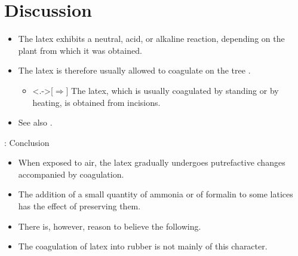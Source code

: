 \section{Discussion}


\begin{frame}{\titleprefix}

	\begin{itemize}[<+->]
		\item The latex exhibits a neutral, acid, or alkaline reaction, depending on the plant from which it was obtained.
		\item The latex is therefore usually allowed to coagulate on the tree \citep{Koszegi2013}.
			\begin{itemize}
				\item<.->[$\Rightarrow$] The latex, which is usually coagulated by standing or by heating, is obtained from incisions.
			\end{itemize}
		\item See also \cite{Bordalo2013, Dohmen2012}.
	\end{itemize}	

\end{frame}


\begin{frame}{\titleprefix: Conclusion}

	\begin{itemize}
		\item When exposed to air, the latex gradually undergoes putrefactive changes accompanied by coagulation.
		\item The addition of a small quantity of ammonia or of formalin to some latices has the effect of preserving them.
		\item There is, however, reason to believe the following.
		\item The coagulation of latex into rubber is not mainly of this character.
	\end{itemize}

\end{frame}


